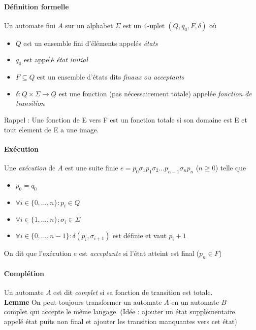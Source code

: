 \documentclass[a4paper]{article}
\begin{document}
  \paragraph{Définition formelle} Un automate fini $A$ sur un alphabet $\Sigma$
  est un 4-uplet $(Q, q_0, F, \delta)$ où
  \begin{itemize}
    \item $Q$ est un ensemble fini d'éléments appelés \textit{états}
    \item $q_0$ est appelé \textit{état initial}
    \item $F \subseteq Q$ est un ensemble d'états dits \textit{finaux ou acceptants}
    \item $\delta : Q \times \Sigma \rightarrow Q $ est une fonction (pas nécessairement totale)
    appelée \textit{fonction de transition}
  \end{itemize}
  
  Rappel : Une fonction de E vers F est un fonction totale si son domaine est E et tout element de E a une image.

  \paragraph{Exécution} Une \textit{exécution} de $A$ est une suite finie 
  $e = p_0 \sigma_1 p_1 \sigma_2 ... p_{n-1} \sigma_n p_n$ ($n \geq 0$) telle que
  \begin{itemize}
    \item $p_0 = q_0$
    \item $\forall i \in \{0,...,n\} : p_i \in Q$
    \item $\forall i \in \{1,...,n\} : \sigma_i \in \Sigma$
    \item $\forall i \in \{0,...,n-1\} : \delta(p_i, \sigma_{i+1})$ est définie
    et vaut $p_i+1$
  \end{itemize}
  On dit que l'exécution $e$ est \textit{acceptante} si l'état atteint est final ($p_n \in F$)

  \paragraph{Complétion} Un automate $A$ est dit \textit{complet} si sa fonction de
  transition est totale.\\

  \textbf{Lemme} On peut toujours transformer un automate $A$ en un automate $B$
  complet qui accepte le même langage. (Idée : ajouter un état supplémentaire 
  appelé état puits non final et ajouter les transition manquantes vers cet état)
\end{document}
